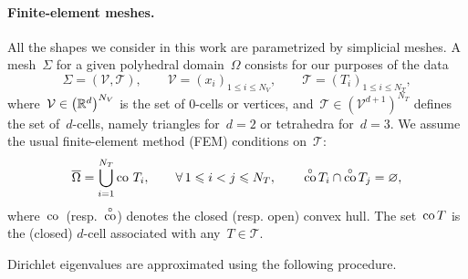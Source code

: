 \paragraph{Finite-element meshes.}
All the shapes we consider in this work are parametrized by simplicial meshes. A mesh~$\Sigma$ for a given polyhedral domain~$\Omega$ consists for our purposes of the data
\begin{equation}
    \label{03:eq:mesh}
    \Sigma = (\mathcal V,\mathcal T),\qquad\mathcal V = \left(x_i\right)_{1\leq i\leq N_V},\qquad \mathcal T=\left(T_i\right)_{1\leq i\leq N_T},
\end{equation}
where~$\mathcal V \in \left(\mathbb{R}^d\right)^{N_V}$ is the set of $0$-cells or vertices, and~$\mathcal T \in \left(\mathcal V^{d+1}\right)^{N_T}$ defines the set of~$d$-cells, namely triangles for~$d=2$ or tetrahedra for~$d=3$.
We assume the usual finite-element method (FEM) conditions on~$\mathcal T$:
\begin{equation}
    \label{03:eq:mesh_conditions}
    \overline{\Omega} = \bigcup_{i=1}^{N_T} \operatorname{co}\,T_i,\qquad \forall\,1\leqslant i < j \leqslant N_T,\qquad\, \overset{\circ}{\operatorname{co}}\,T_i\cap \overset{\circ}{\operatorname{co}}\,T_j= \varnothing,
\end{equation}
where~$\operatorname{co}$~(resp.~$\overset{\circ}{\operatorname{co}}$) denotes the closed (resp. open) convex hull. The set~$\operatorname{co} T$ is the (closed) $d$-cell associated with any~$T\in\mathcal T$.

Dirichlet eigenvalues are approximated using the following procedure.
